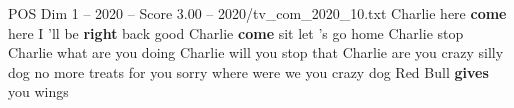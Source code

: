 \begin{textsample}{POS Dim 1 – 2020 – Score 3.00 – 2020/tv\_com\_2020\_10.txt}  \label{ex:f1_pos_089}
Charlie here \textbf{come} here I 'll be \textbf{right} back good Charlie \textbf{come} sit let 's go home Charlie stop Charlie what are you doing Charlie will you stop that Charlie are you crazy silly dog no more treats for you sorry where were we you crazy dog Red Bull \textbf{gives} you wings

\end{textsample}
